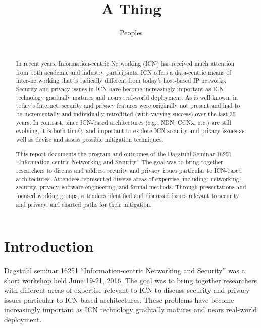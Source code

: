\documentclass{sig-alternate-10pt}
\begin{document}
\title{A Thing}

\author{
\alignauthor
Peoples \\
\\
}

\maketitle

\begin{abstract}
In recent years, Information-centric Networking (ICN) has received much attention from
both academic and industry participants. ICN offers a data-centric means of inter-networking
that is radically different from today's host-based IP networks. Security and privacy issues
in ICN have become increasingly important as ICN technology gradually matures and nears
real-world deployment. As is well known, in today's Internet, security and privacy features
were originally not present and had to be incrementally and individually retrofitted
(with varying success) over the last 35 years. In contrast, since ICN-based architectures
(e.g., NDN, CCNx, etc.) are still evolving, it is both timely and important to explore
ICN security and privacy issues as well as devise and assess possible mitigation techniques.

This report documents the program and outcomes of the Dagstuhl Seminar 16251
``Information-centric Networking and Security.'' The goal was to bring together
researchers to discuss and address security and privacy issues particular to ICN-based
architectures. Attendees represented diverse areas of expertise, including: networking,
security, privacy, software engineering, and formal methods. Through presentations and
focused working groups, attendees identified and discussed issues relevant to security
and privacy, and charted paths for their mitigation.
\end{abstract}

\section{Introduction}
Dagstuhl seminar 16251 ``Information-centric Networking and Security'' was a short
workshop held June 19-21, 2016. The goal was to bring together researchers with
different areas of expertise relevant to ICN to discuss security and privacy issues
particular to ICN-based architectures. These problems have become increasingly
important as ICN technology gradually matures and nears real-world deployment.
\end{document}
